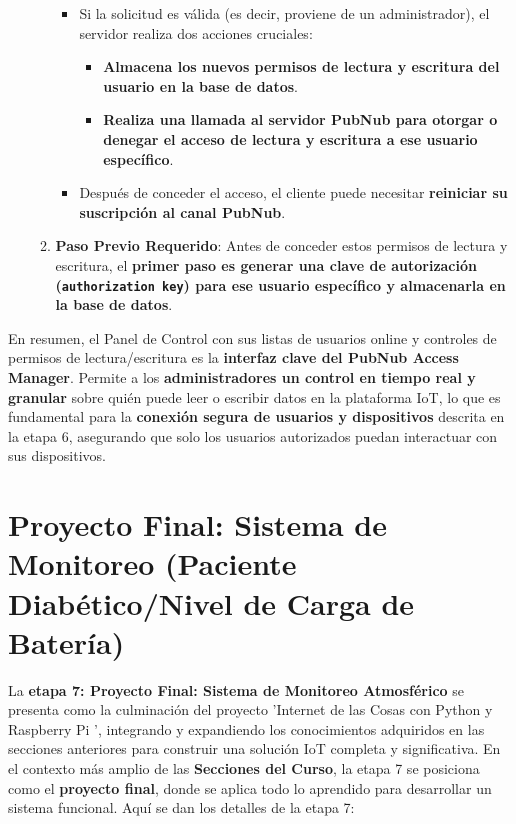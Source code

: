 \documentclass{report}
\begin{document}
\begin{itemize}
\begin{enumerate}
\begin{itemize}
            \item Si la solicitud es válida (es decir, proviene de un administrador), el servidor realiza dos acciones cruciales:
            \begin{itemize}
                \item \textbf{Almacena los nuevos permisos de lectura y escritura del usuario en la base de datos}.
                \item \textbf{Realiza una llamada al servidor PubNub para otorgar o denegar el acceso de lectura y escritura a ese usuario específico}.
            \end{itemize}
            \item Después de conceder el acceso, el cliente puede necesitar \textbf{reiniciar su suscripción al canal PubNub}.
        \end{itemize}
    \item \textbf{Paso Previo Requerido}: Antes de conceder estos permisos de lectura y escritura, el \textbf{primer paso es generar una clave de 
    autorización (\texttt{authorization key}) para ese usuario específico y almacenarla en la base de datos}.
    \end{enumerate}
\end{itemize}
En resumen, el Panel de Control con sus listas de usuarios online y controles de permisos de lectura/escritura es la \textbf{interfaz clave del PubNub 
Access Manager}. Permite a los \textbf{administradores un control en tiempo real y granular} sobre quién puede leer o escribir datos en la plataforma 
IoT, lo que es fundamental para la \textbf{conexión segura de usuarios y dispositivos} descrita en la etapa 6, asegurando que solo los usuarios 
autorizados puedan interactuar con sus dispositivos.

\section{Proyecto Final: Sistema de Monitoreo (Paciente Diabético/Nivel de Carga de Batería)}
La \textbf{etapa 7: Proyecto Final: Sistema de Monitoreo Atmosférico} se presenta como la culminación del proyecto  'Internet de las Cosas con Python 
y Raspberry Pi ', integrando y expandiendo los conocimientos adquiridos en las secciones anteriores para construir una solución IoT completa y 
significativa. En el contexto más amplio de las \textbf{Secciones del Curso}, la etapa 7 se posiciona como el \textbf{proyecto final}, donde se 
aplica todo lo aprendido para desarrollar un sistema funcional. Aquí se dan los detalles de la etapa 7:
\end{document}
